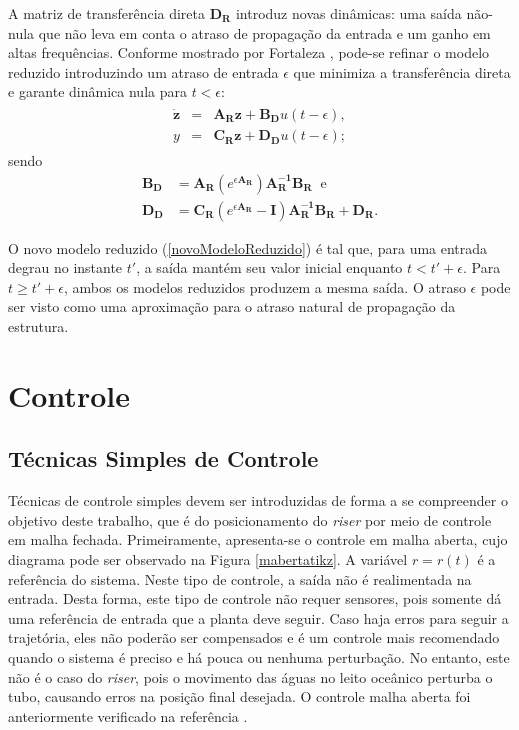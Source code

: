 A matriz de transferência direta $\mathbf{D_R}$ introduz novas dinâmicas: uma saída não-nula que não leva em conta o atraso de propagação da entrada e um ganho em altas frequências. Conforme mostrado por Fortaleza \cite{teseEugenio}, pode-se refinar o modelo reduzido introduzindo um atraso de entrada $\epsilon$ que minimiza a transferência direta e garante dinâmica nula para $t < \epsilon$: \begin{align}
\begin{array}{lll}
	\mathbf{\dot{z}} &=& \mathbf{A_R}\mathbf{z}+\mathbf{B_D}u(t-\epsilon),\\
	y &=& \mathbf{C_R}\mathbf{z}+\mathbf{D_D}u(t-\epsilon) \label{novoModeloReduzido};
\end{array}
\end{align} sendo \begin{align}
	\mathbf{B_D} &= \mathbf{A_R}\left(e^{\epsilon\mathbf{A_R}}\right)\mathbf{A_R^{-1}}\mathbf{B_R}\;\;\mathrm{e}\\
	\mathbf{D_D} &= \mathbf{C_R}\left(e^{\epsilon\mathbf{A_R}} - \mathbf{I}\right)\mathbf{A_R^{-1}}\mathbf{B_R} + \mathbf{D_R}.
\end{align}

 O novo modelo reduzido (\ref{novoModeloReduzido}) é tal que, para uma entrada degrau no instante $t'$, a saída mantém seu valor inicial enquanto $t < t' + \epsilon$. Para $t \ge t' + \epsilon$, ambos os modelos reduzidos produzem a mesma saída. O atraso $\epsilon$ pode ser visto como uma aproximação para o atraso natural de propagação da estrutura.

\section{Controle\label{controle}}
\subsection{Técnicas Simples de Controle} \label{SimpleControlSection}
 Técnicas de controle simples devem ser introduzidas de forma a se compreender o objetivo deste trabalho, que é do posicionamento do \textit{riser} por meio de controle em malha fechada. Primeiramente, apresenta-se o controle em malha aberta, cujo diagrama pode ser observado na Figura \ref{mabertatikz}. A variável $r = r(t)$ é a referência do sistema. Neste tipo de controle, a saída não é realimentada na entrada. Desta forma, este tipo de controle não requer sensores, pois somente dá uma referência de entrada que a planta deve seguir. Caso haja erros para seguir a trajetória, eles não poderão ser compensados e é um controle mais recomendado quando o sistema é preciso e há pouca ou nenhuma perturbação. No entanto, este não é o caso do \textit{riser}, pois o movimento das águas no leito oceânico perturba o tubo, causando erros na posição final desejada. O controle malha aberta foi anteriormente verificado na referência \cite{redytton}.

